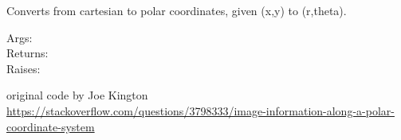 \documentclass[a4paper,10pt,english]{sphinxmanual}
\begin{document}
\begin{fulllineitems}
\label{ryutils:pyradi.ryutils.cart2polar}
Converts from cartesian to polar coordinates, given (x,y) to (r,theta).
\begin{description}
\item[{Args:}] \leavevmode
{}

\item[{Returns:}] \leavevmode
{}

\item[{Raises:}] \leavevmode
{}

\end{description}

original code by Joe Kington
\href{https://stackoverflow.com/questions/3798333/image-information-along-a-polar-coordinate-system}{https://stackoverflow.com/questions/3798333/image-information-along-a-polar-coordinate-system}

\end{fulllineitems}

\end{document}
